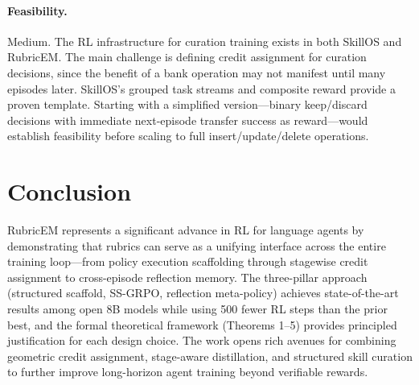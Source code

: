 \documentclass[11pt,a4paper]{article}
\begin{document}
\paragraph{Feasibility.} Medium. The RL infrastructure for curation training exists in both SkillOS and RubricEM. The main challenge is defining credit assignment for curation decisions, since the benefit of a bank operation may not manifest until many episodes later. SkillOS's grouped task streams and composite reward provide a proven template. Starting with a simplified version---binary keep/discard decisions with immediate next-episode transfer success as reward---would establish feasibility before scaling to full insert/update/delete operations.

\section{Conclusion}

RubricEM represents a significant advance in RL for language agents by demonstrating that rubrics can serve as a unifying interface across the entire training loop---from policy execution scaffolding through stagewise credit assignment to cross-episode reflection memory. The three-pillar approach (structured scaffold, SS-GRPO, reflection meta-policy) achieves state-of-the-art results among open 8B models while using 500 fewer RL steps than the prior best, and the formal theoretical framework (Theorems 1--5) provides principled justification for each design choice. The work opens rich avenues for combining geometric credit assignment, stage-aware distillation, and structured skill curation to further improve long-horizon agent training beyond verifiable rewards.
\end{document}
